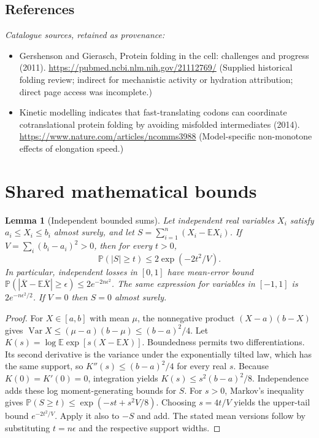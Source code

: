 \documentclass[11pt]{article}
\newcommand{\E}{\mathbb E}
\newcommand{\Prob}{\mathbb P}
\DeclareMathOperator{\Var}{Var}
\providecommand{\E}{\mathbb E}
\providecommand{\Prob}{\mathbb P}
\providecommand{\Var}{\operatorname{Var}}
\newtheorem{sharedlemma}{Lemma}[section]
\begin{document}
\subsection{References}
\noindent\emph{Catalogue sources, retained as provenance:}
\begin{itemize}
\item Gershenson and Gierasch, Protein folding in the cell: challenges and progress (2011). \url{https://pubmed.ncbi.nlm.nih.gov/21112769/} (Supplied historical folding review; indirect for mechanistic activity or hydration attribution; direct page access was incomplete.)
\item Kinetic modelling indicates that fast-translating codons can coordinate cotranslational protein folding by avoiding misfolded intermediates (2014). \url{https://www.nature.com/articles/ncomms3988} (Model-specific non-monotone effects of elongation speed.)
\end{itemize}
\clearpage


\appendix
\section{Shared mathematical bounds}\label{app:bounds}
\begin{sharedlemma}[Independent bounded sums]\label{lem:bounded}
Let independent real variables $X_i$ satisfy $a_i\leq X_i\leq b_i$ almost surely,
and let $S=\sum_{i=1}^n(X_i-\E X_i)$. If
$V=\sum_i(b_i-a_i)^2>0$, then for every $t>0$,
\[
 \Prob(|S|\geq t)\leq 2\exp(-2t^2/V).
\]
In particular, independent losses in $[0,1]$ have mean-error bound
$\Prob(|\overline X-\E\overline X|\geq\epsilon)
\leq2e^{-2n\epsilon^2}$. The same expression for variables in $[-1,1]$
is $2e^{-n\epsilon^2/2}$. If $V=0$ then $S=0$ almost surely.
\end{sharedlemma}
\begin{proof}
For $X\in[a,b]$ with mean $\mu$, the nonnegative product
$(X-a)(b-X)$ gives
$\Var X\leq(\mu-a)(b-\mu)\leq(b-a)^2/4$.
Let $K(s)=\log\E\exp[s(X-\E X)]$.
Boundedness permits two differentiations. Its second derivative is the variance
under the exponentially tilted law, which has the same support, so
$K''(s)\leq(b-a)^2/4$ for every real $s$.
Because $K(0)=K'(0)=0$, integration yields
$K(s)\leq s^2(b-a)^2/8$.
Independence adds these log moment-generating bounds for $S$.
For $s>0$, Markov's inequality gives
$\Prob(S\geq t)\leq\exp(-st+s^2V/8)$.
Choosing $s=4t/V$ yields the upper-tail bound $e^{-2t^2/V}$.
Apply it also to $-S$ and add. The stated mean versions follow by substituting
$t=n\epsilon$ and the respective support widths.
\end{proof}
\end{document}
